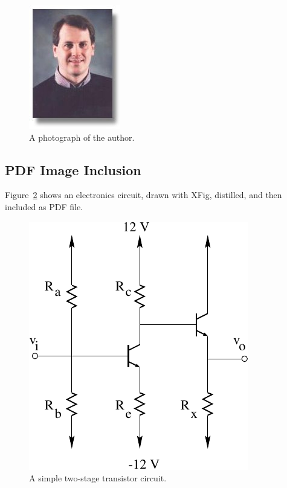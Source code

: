 \documentclass{article}
\begin{document}
\begin{figure}
  \begin{center}
    \includegraphics{mwicks.jpeg}
  \end{center}

  \caption{A photograph of the author.}
  \label{fig:author}
\end{figure}

\subsection{PDF Image Inclusion}
Figure~\ref{fig:circuit} shows
an electronics circuit,
drawn with XFig, distilled,
and then included as PDF file.
\begin{figure}
  \begin{center}
     \includegraphics{transistor.pdf}
  \end{center}

  \caption{A simple two-stage transistor circuit.}
  \label{fig:circuit}
\end{figure}
\end{document}
